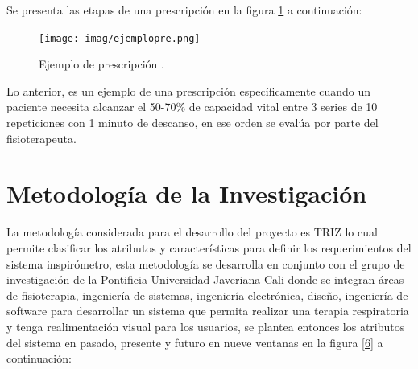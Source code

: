 \documentclass[12pt]{article}
\begin{document}
Se presenta las etapas de una prescripción en la figura \ref{5} a continuación:

\begin{figure}[htp]
\centering
\texttt{[image: imag/ejemplopre.png]}
\caption{Ejemplo de prescripción \cite{8}.}
\label{5}
\end{figure}
\FloatBarrier

Lo anterior, es un ejemplo de una prescripción específicamente cuando un paciente necesita alcanzar el 50-70\% de capacidad vital entre 3 series de 10 repeticiones con 1 minuto de descanso, en ese orden se evalúa por parte del fisioterapeuta.















\clearpage

\section{Metodología de la Investigación}

La metodología considerada para el desarrollo del proyecto es TRIZ lo cual permite clasificar los atributos y características para definir los requerimientos del sistema inspirómetro, esta metodología se desarrolla en conjunto con el grupo de investigación de la Pontificia Universidad Javeriana Cali donde se integran áreas de fisioterapia, ingeniería de sistemas, ingeniería electrónica, diseño, ingeniería de software para desarrollar un sistema que permita realizar una terapia respiratoria y tenga realimentación visual para los usuarios, se plantea entonces los atributos del sistema en pasado, presente y futuro en nueve ventanas en la figura \ref{6} a continuación:
\end{document}
